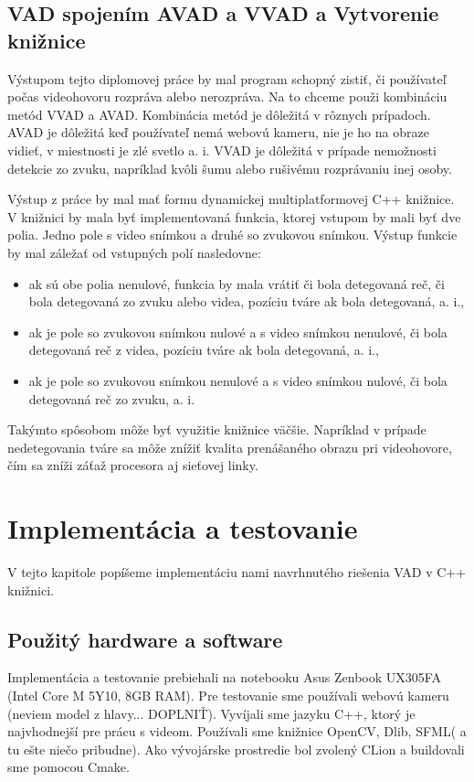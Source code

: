\section{VAD spojením AVAD a VVAD a Vytvorenie knižnice}
Výstupom tejto diplomovej práce by mal program schopný zistiť, či používateľ počas videohovoru rozpráva alebo nerozpráva. 
Na to chceme použi kombináciu metód VVAD a AVAD. 
Kombinácia metód je dôležitá v rôznych prípadoch. 
AVAD je dôležitá keď používateľ nemá webovú kameru, nie je ho na obraze vidieť, v miestnosti je zlé svetlo a. i.
VVAD je dôležitá v prípade nemožnosti detekcie zo zvuku, napríklad kvôli šumu alebo rušivému rozprávaniu inej osoby.

Výstup z práce by mal mať formu dynamickej multiplatformovej C++ knižnice. 
V knižnici by mala byť implementovaná funkcia, ktorej vstupom by mali byť dve polia. 
Jedno pole s video snímkou a druhé so zvukovou snímkou.
Výstup funkcie by mal záležať od vstupných polí nasledovne:
\begin{itemize}
	\item ak sú obe polia nenulové, funkcia by mala vrátiť či bola detegovaná reč, či bola detegovaná zo zvuku alebo videa, pozíciu tváre ak bola detegovaná, a. i., 
	\item ak je pole so zvukovou snímkou nulové a s video snímkou nenulové, či bola detegovaná reč z videa, pozíciu tváre ak bola detegovaná, a. i.,
	\item ak je pole so zvukovou snímkou nenulové a s video snímkou nulové, či bola detegovaná reč zo zvuku, a. i.
\end{itemize}
Takýmto spôsobom môže byť využitie knižnice väčšie.
Napríklad v prípade nedetegovania tváre sa môže znížiť kvalita prenášaného obrazu pri videohovore, čím sa zníži záťaž procesora aj sieťovej linky.

\chapter{Implementácia a testovanie}

V tejto kapitole popíšeme implementáciu nami navrhnutého riešenia VAD v C++ knižnici.

\section{Použitý hardware a software}
Implementácia a testovanie prebiehali na notebooku Asus Zenbook UX305FA (Intel Core M 5Y10, 8GB RAM). 
Pre testovanie sme používali webovú kameru (neviem model z hlavy... DOPLNIŤ).
Vyvíjali sme jazyku C++, ktorý je najvhodnejší pre prácu s videom.
Používali sme knižnice OpenCV, Dlib, SFML( a tu ešte niečo pribudne).
Ako vývojárske prostredie bol zvolený CLion a buildovali sme pomocou Cmake.

